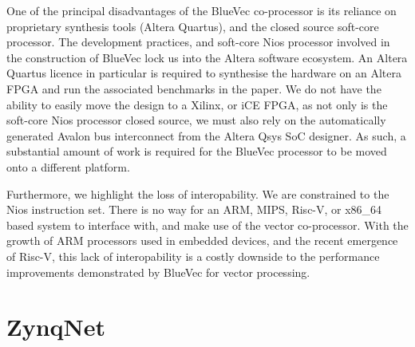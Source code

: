 \documentclass[a4paper,8pt]{report}
\begin{document}
One of the principal disadvantages of the BlueVec co-processor is its reliance
on proprietary synthesis tools (Altera Quartus), and the closed source soft-core
processor. The development practices, and soft-core Nios processor involved in
the construction of BlueVec lock us into the Altera software ecosystem. An
Altera Quartus licence in particular is required to synthesise the hardware on
an Altera FPGA and run the associated benchmarks in the paper. We do not have
the ability to easily move the design to a Xilinx, or iCE FPGA, as not only is
the soft-core Nios processor closed source, we must also rely on the
automatically generated Avalon bus interconnect from the Altera Qsys SoC
designer. As such, a substantial amount of work is required for the BlueVec
processor to be moved onto a different platform.


Furthermore, we highlight the loss of interopability. We are constrained to the
Nios instruction set. There is no way for an ARM, MIPS, Risc-V, or x86\_64 based
system to interface with, and make use of the vector co-processor. With the
growth of ARM processors used in embedded devices, and the recent emergence of
Risc-V, this lack of interopability is a costly downside to the performance
improvements demonstrated by BlueVec for vector processing.



\section{ZynqNet}


% 

\end{document}
